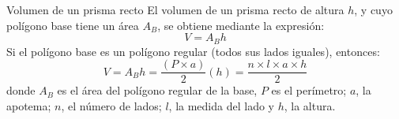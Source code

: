 
\begin{infocard}{Volumen de un prisma recto}
    El volumen de un prisma recto de altura $h$, y cuyo polígono base tiene un área $A_B$, se obtiene mediante la expresión:
    \[
        V = A_B h
    \]
    Si el polígono base es un polígono regular (todos sus lados iguales), entonces:
    \[
        V = A_B h = \dfrac{\left( P \times a \right)}{2} (h) = \dfrac{n \times l \times a \times h}{2}
    \]
    donde $A_B$ es el área del polígono regular de la base, $P$ es el perímetro; $a$, la apotema; $n$, el número de
    lados; $l$, la medida del lado y $h$, la altura.
\end{infocard}



